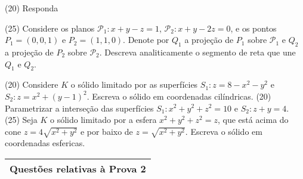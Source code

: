 \documentclass[11pt]{exam}
\begin{document}
   \begin{questions} 
   \question (20) Responda
   \question (25)
   Considere os planos 
   $\mathcal{P}_1: x+y-z=1$, $\mathcal{P}_2: x+y-2z=0$, e os pontos $P_1=(0,0,1)$
   e $P_2=(1,1,0)$. Denote por $Q_{1}$ a projeção de $P_{1}$ sobre $\mathcal{P}_{1}$ e $Q_{2}$ a projeção de $P_{2}$ sobre 
   $\mathcal{P}_{2}$. 
   Descreva analiticamente o segmento de reta que une
   $Q_{1}$ e $Q_{2}$. 
         
  \question (20) Considere $K$ o sólido limitado por 
     as superfícies $S_{1}: z=8-x^{2}-y^{2}$ 
     e 
      $S_{2}: z=x^{2}+(y-1)^{2}$. 
     Escreva o sólido em coordenadas cilíndricas. 
  \question (20) Parametrizar a interseção das superfícies 
  $S_{1}: x^{2}+y^{2}+z^{2}=10$ 
     e $S_{2}: z+y=4$. 
   \question (25)
  Seja $K$ o sólido limitado por a esfera 
  $x^{2}+y^{2}+z^{2}=z$, que está acima do cone 
  $z=4\sqrt{x^{2}+y^{2}}$ e por baixo de $z=\sqrt{x^{2}+y^{2}}$. Escreva o sólido em coordenadas esfericas.
 \end{questions}
 
  \begin{center}
  \begin{tabular}{|l|}
    \hline
    {\bf Questões relativas à Prova 2} \\
    \hline
     \end{tabular}
  \end{center}
  
\end{document}
